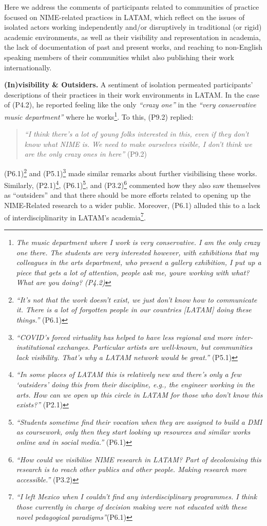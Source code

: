 \documentclass[sigconf]{nimeart}
\begin{document}
Here we address the comments of participants related to communities of practice focused on NIME-related practices in LATAM, which reflect on the issues of isolated actors working independently and/or disruptively in traditional (or rigid) academic environments, as well as their visibility and representation in academia, the lack of documentation of past and present works, and reaching to non-English speaking members of their communities whilst also publishing their work internationally.

\textbf{(In)visibility \& Outsiders.} A sentiment of isolation permeated participants' descriptions of their practices in their work environments in LATAM. In the case of (P4.2), he reported feeling like the only \emph{``crazy one''} in the \emph{``very conservative music department''} where he works\footnote{\emph{The music department where I work is very conservative. I am the only crazy one there. The students are very interested however, with exhibitions that my colleagues in the arts department, who present a gallery exhibition, I put up a piece that gets a lot of attention, people ask me, you\textquotesingle re working with what? What are you doing? (P4.2)}}. To this, (P9.2) replied:

\begin{quote}
\emph{``I think there's a lot of young folks interested in this, even if they don't know what NIME is. We need to make ourselves visible, I don't think we are the only crazy ones in here''} (P9.2)
\end{quote}

(P6.1)\footnote{\emph{``It's not that the work doesn't exist, we just don't know how to communicate it. There is a lot of forgotten people in our countries {[}LATAM{]} doing these things.''} (P6.1)} and (P5.1)\footnote{\emph{``COVID's forced virtuality has helped to have less regional and more inter-institutional exchanges. Particular artists are well-known, but communities lack visibility. That's why a LATAM network would be great.''} (P5.1)} made similar remarks about further visibilising these works. Similarly, (P2.1)\footnote{\emph{``In some places of LATAM this is relatively new and there's only a few `outsiders' doing this from their discipline, e.g., the engineer working in the arts. How can we open up this circle in LATAM for those who don't know this exists?''} (P2.1)}, (P6.1)\footnote{\emph{``Students sometime find their vocation when they are assigned to build a DMI as coursework, only then they start looking up resources and similar works online and in social media.''} (P6.1)}, and (P3.2)\footnote{\emph{``How could we visibilise NIME research in LATAM? Part of decolonising this research is to reach other publics and other people. Making research more accessible.''} (P3.2)} commented how they also saw themselves as ``outsiders'' and that there should be more efforts related to opening up the NIME-Related research to a wider public. Moreover, (P6.1) alluded this to a lack of interdisciplinarity in LATAM's academia\footnote{\emph{``I left Mexico when I couldn't find any interdisciplinary programmes. I think those currently in charge of decision making were not educated with these novel pedagogical paradigms''}(P6.1)}.
\end{document}
